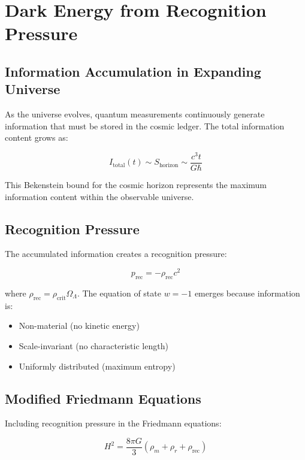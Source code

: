 \documentclass[12pt,letterpaper]{article}
\begin{document}
\section{Dark Energy from Recognition Pressure}
\label{sec:darkenergy}

\subsection{Information Accumulation in Expanding Universe}

As the universe evolves, quantum measurements continuously generate information that must be stored in the cosmic ledger. The total information content grows as:

\begin{equation}
I_{\text{total}}(t) \sim S_{\text{horizon}} \sim \frac{c^3 t}{G\hbar}
\label{eq:I_total}
\end{equation}

This Bekenstein bound for the cosmic horizon represents the maximum information content within the observable universe.

\subsection{Recognition Pressure}

The accumulated information creates a recognition pressure:

\begin{equation}
p_{\text{rec}} = -\rho_{\text{rec}} c^2
\label{eq:p_rec}
\end{equation}

where $\rho_{\text{rec}} = \rho_{\text{crit}} \Omega_\Lambda$. The equation of state $w = -1$ emerges because information is:
\begin{itemize}
\item Non-material (no kinetic energy)
\item Scale-invariant (no characteristic length)
\item Uniformly distributed (maximum entropy)
\end{itemize}

\subsection{Modified Friedmann Equations}

Including recognition pressure in the Friedmann equations:

\begin{equation}
H^2 = \frac{8\pi G}{3}(\rho_m + \rho_r + \rho_{\text{rec}})
\label{eq:friedmann1}
\end{equation}
\end{document}

